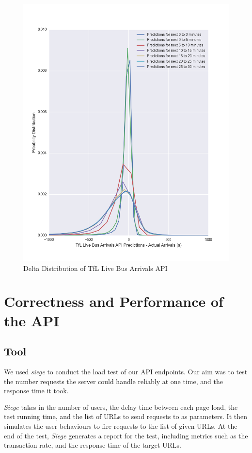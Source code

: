 \begin{figure}
\centering
\includegraphics[width=\textwidth]{figures/countdown.png}
\caption{\label{fig:countdown} Delta Distribution of TfL Live Bus Arrivals API}
\end{figure}


\section{Correctness and Performance of the API}
\subsection{Tool}
\par We used \textit{siege}\cite{siege} to conduct the load test of our API endpoints. Our aim was to test the number requests the server could handle reliably at one time, and the response time it took.

\par \textit{Siege} takes in the number of users, the delay time between each page load, the test running time, and the list of URLs to send requests to as parameters. It then simulates the user behaviours to fire requests to the list of given URLs. At the end of the test, \textit{Siege} generates a report for the test, including metrics such as the transaction rate, and the response time of the target URLs.

